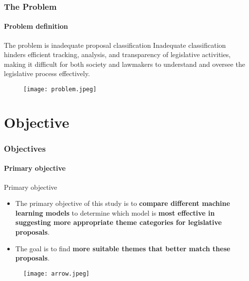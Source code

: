 \begin{frame}
	\frametitle{The Problem}
	\framesubtitle{Problem definition}	

	\begin{alertblock}{The problem is inadequate proposal classification}
		Inadequate classification hinders efficient tracking, analysis, and transparency of legislative activities, making it difficult for both society and lawmakers to understand and oversee the legislative process effectively.
	\end{alertblock}	

	\begin{figure}
		\texttt{[image: problem.jpeg]}
	\end{figure}


\end{frame}
\section{Objective}

\begin{frame}
	\frametitle{Objectives}
	\framesubtitle{Primary objective}
	
	\begin{exampleblock}{Primary objective} 
		\begin{itemize}
			\item The primary objective of this study is to \textbf{compare different machine learning models} to determine which model is \textbf{most effective in suggesting more appropriate theme categories for legislative proposals}.
			
			\item The goal is to find \textbf{more suitable themes that better match these proposals}.  
		\end{itemize}
	\end{exampleblock}
	
	\begin{figure}
		\texttt{[image: arrow.jpeg]}
	\end{figure}
	
	
\end{frame}


